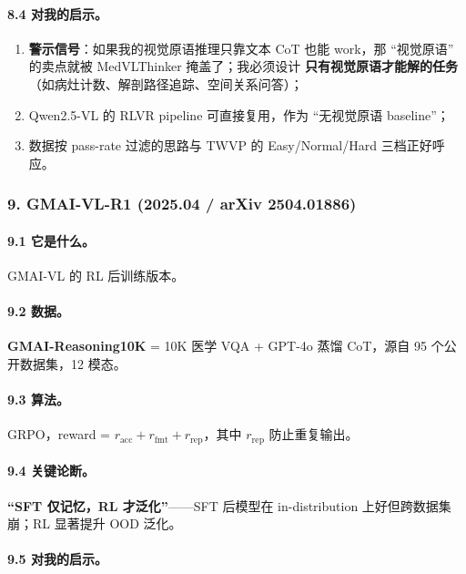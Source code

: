 \paragraph{8.4 对我的启示。}

\begin{enumerate}[leftmargin=1.5em]
  \item \textbf{警示信号}：如果我的视觉原语推理只靠文本 CoT 也能 work，那 ``视觉原语'' 的卖点就被 MedVLThinker 掩盖了；我必须设计 \textbf{只有视觉原语才能解的任务}（如病灶计数、解剖路径追踪、空间关系问答）；
  \item Qwen2.5-VL 的 RLVR pipeline 可直接复用，作为 ``无视觉原语 baseline''；
  \item 数据按 pass-rate 过滤的思路与 TWVP 的 Easy/Normal/Hard 三档正好呼应。
\end{enumerate}

\subsubsection*{9. GMAI-VL-R1 (2025.04 / arXiv 2504.01886)}

\paragraph{9.1 它是什么。}
GMAI-VL 的 RL 后训练版本。

\paragraph{9.2 数据。}
\textbf{GMAI-Reasoning10K} = 10K 医学 VQA + GPT-4o 蒸馏 CoT，源自 95 个公开数据集，12 模态。

\paragraph{9.3 算法。}
GRPO，reward = $r_\text{acc} + r_\text{fmt} + r_\text{rep}$，其中 $r_\text{rep}$ 防止重复输出。

\paragraph{9.4 关键论断。}
\textbf{``SFT 仅记忆，RL 才泛化''}——SFT 后模型在 in-distribution 上好但跨数据集崩；RL 显著提升 OOD 泛化。

\paragraph{9.5 对我的启示。}

